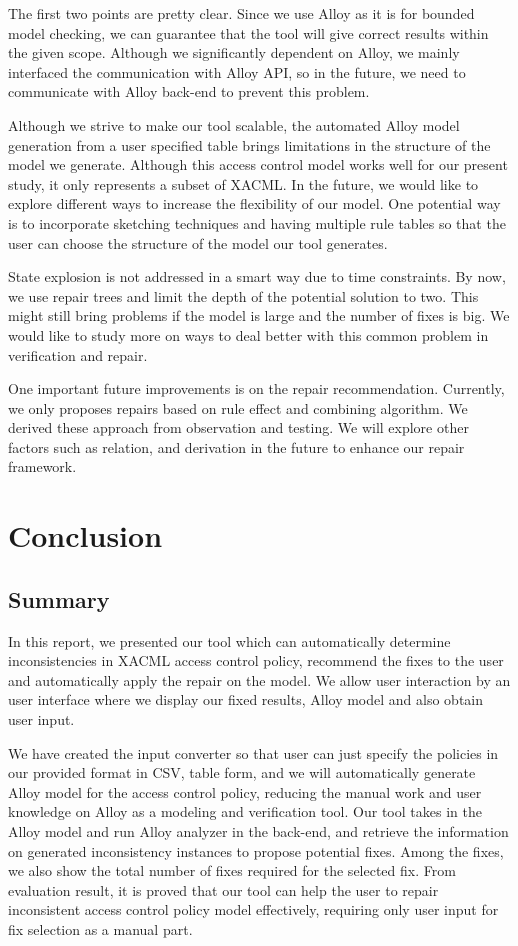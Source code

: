 \documentclass{acm_proc_article-sp}
\begin{document}
The first two points are pretty clear. Since we use Alloy as it is for bounded model checking, we can guarantee that the tool will give correct results within the given scope. Although we significantly dependent on Alloy, we mainly interfaced the communication with Alloy API, so in the future, we need to communicate with Alloy back-end to prevent this problem.

Although we strive to make our tool scalable, the automated Alloy model generation from a user specified table brings limitations in the structure of the model we generate. Although this access control model works well for our present study, it only represents a subset of XACML. In the future, we would like to explore different ways to increase the flexibility of our model. One potential way is to incorporate sketching techniques and having multiple rule tables so that the user can choose the structure of the model our tool generates.

State explosion is not addressed in a smart way due to time constraints. By now, we use repair trees and limit the depth of the potential solution to two. This might still bring problems if the model is large and the number of fixes is big. We would like to study more on ways to deal better with this common problem in verification and repair.

One important future improvements is on the repair recommendation. Currently, we only proposes repairs based on rule effect and combining algorithm. We derived these approach from observation and testing. We will explore other factors such as relation, and derivation in the future to enhance our repair framework.

\section{Conclusion}

\subsection{Summary}
In this report, we presented our tool which can automatically determine inconsistencies in XACML access control policy, recommend the fixes to the user and automatically apply the repair on the model. We allow user interaction by an user interface where we display our fixed results, Alloy model and also obtain user input.

We have created the input converter so that user can just specify the policies in our provided format in CSV, table form, and we will automatically generate Alloy model for the access control policy, reducing the manual work and user knowledge on Alloy as a modeling and verification tool. Our tool takes in the Alloy model and run Alloy analyzer in the back-end, and retrieve the information on generated inconsistency instances to propose potential fixes. Among the fixes, we also show the total number of fixes required for the selected fix. From evaluation result, it is proved that our tool can help the user to repair inconsistent access control policy model effectively, requiring only user input for fix selection as a manual part. 
\end{document}
